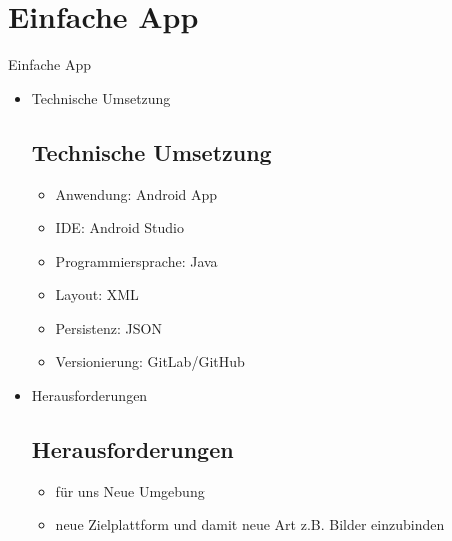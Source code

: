 \documentclass[10pt,fleqn]{beamer}
\begin{document}
\section{Einfache App}
\begin{frame}[t]{Einfache App}
	\begin{itemize}
		\item Technische Umsetzung
		\subsection{Technische Umsetzung}
		\begin{itemize}
			\item Anwendung: Android App
			\item IDE: Android Studio
			\item Programmiersprache: Java
			\item Layout: XML
			\item Persistenz: JSON
			\item Versionierung: GitLab/GitHub
		\end{itemize}
		\item Herausforderungen
		\subsection{Herausforderungen}
		\begin{itemize}
			\item für uns Neue Umgebung
			\item neue Zielplattform und damit neue Art z.B. Bilder einzubinden
		\end{itemize}
	\end{itemize}
\end{frame}
\end{document}
